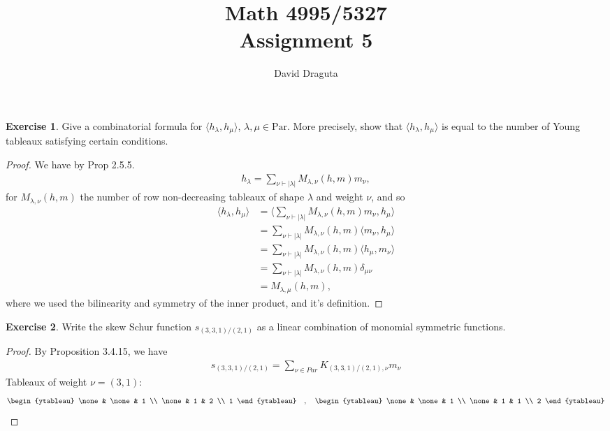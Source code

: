 \documentclass[12pt]{extarticle}
\title{ Math 4995/5327
  \\
  Assignment 5}
\author{David Draguta}
\newcommand{\abs}[1]{|#1|}
\newcommand{\<}{\langle}
\renewcommand{\>}{\rangle}
\theoremstyle{definition}
\newtheorem{exercise}{Exercise}
\begin{document}
\maketitle

\begin{exercise}
  Give a combinatorial formula for $\< h_{\lambda}, h_{\mu} \>$, $\lambda, \mu \in \text{Par}$. More precisely, show that $\<h_{\lambda}, h_{\mu}\>$ is equal to the number of Young tableaux satisfying certain conditions. 
\end{exercise}
\begin{proof}
  We have by Prop 2.5.5.
  \begin{align*}
    h_{\lambda} = \sum\limits_{\nu \vdash \abs{\lambda}} M_{\lambda, \nu}(h,m)m_{\nu},
  \end{align*}
   for $M_{\lambda, \nu}(h,m)$ the number of row non-decreasing tableaux of shape $\lambda$ and weight $\nu$, and so
  \begin{align*}
    \< h_{\lambda}, h_{\mu} \>
    &= \< \sum\limits_{\nu \vdash \abs{\lambda}} M_{\lambda, \nu}(h,m)m_{\nu}, h_{\mu} \> \\
    &= \sum\limits_{\nu \vdash \abs{\lambda}} M_{\lambda, \nu}(h,m) \< m_{\nu}, h_{\mu} \> \\
    &= \sum\limits_{\nu \vdash \abs{\lambda}} M_{\lambda, \nu}(h,m) \< h_{\mu}, m_{\nu}\> \\
    &= \sum\limits_{\nu \vdash \abs{\lambda}} M_{\lambda, \nu}(h,m) \delta_{\mu \nu} \\
    &= M_{\lambda, \mu}(h,m),
  \end{align*}
  where we used the bilinearity and symmetry of the inner product, and it's definition.
\end{proof}
\begin{exercise}
  Write the skew Schur function $s_{(3,3,1)/(2,1)}$ as a linear combination of monomial symmetric functions. 
\end{exercise}
\begin{proof}
  By Proposition 3.4.15, we have
  \begin{align*}
    s_{(3,3,1)/(2,1)} = \sum\limits_{\nu \in Par} K_{(3,3,1)/(2,1), \nu} m_{\nu}
  \end{align*}
  Tableaux of weight $\nu=(3,1)$:
  \begin{align*}
    \begin{ytableau}
      \none & \none & 1 \\
      \none & 1 & 2 \\
      1
    \end{ytableau}\quad,\quad
    \begin{ytableau}
      \none & \none & 1 \\
      \none & 1 & 1 \\
      2
    \end{ytableau}
  \end{align*}
  
\end{proof}
\end{document}
